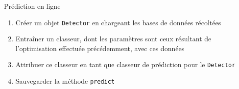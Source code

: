 \documentclass{beamer}
\begin{document}
\begin{frame}{Prédiction en ligne}
\begin{enumerate}
\item Créer un objet \texttt{Detector} en chargeant les bases de données récoltées
\item Entraîner un classeur, dont les paramètres sont ceux résultant de l'optimisation effectuée précédemment, avec ces données
\item Attribuer ce classeur en tant que classeur de prédiction pour le \texttt{Detector}
\item Sauvegarder la méthode \texttt{predict}
\end{enumerate}
\end{frame}
\end{document}
